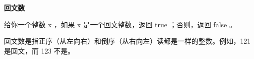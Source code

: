 \textbf{回文数}\par

给你一个整数 x ，如果 x 是一个回文整数，返回 true ；否则，返回 false 。\par

回文数是指正序（从左向右）和倒序（从右向左）读都是一样的整数。例如，121 是回文，而 123 不是。\par
